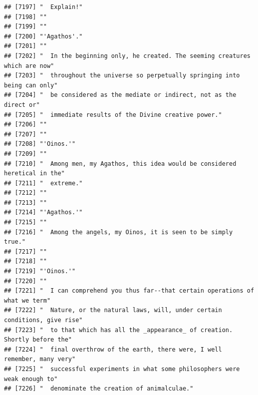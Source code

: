 \documentclass{article}\usepackage[]{graphicx}\usepackage[]{color}
\makeatletter
\newenvironment{kframe}{%
 \def\at@end@of@kframe{}%
 \ifinner\ifhmode%
  \def\at@end@of@kframe{\end{minipage}}%
  \begin{minipage}{\columnwidth}%
 \fi\fi%
 \def\FrameCommand##1{\hskip\@totalleftmargin \hskip-\fboxsep
 \colorbox{shadecolor}{##1}\hskip-\fboxsep
     \hskip-\linewidth \hskip-\@totalleftmargin \hskip\columnwidth}%
 \MakeFramed {\advance\hsize-\width
   \@totalleftmargin\z@ \linewidth\hsize
   \@setminipage}}%
 {\par\unskip\endMakeFramed%
 \at@end@of@kframe}
\newenvironment{knitrout}{}{} %
\makeatother
\begin{document}
\begin{knitrout}
\begin{kframe}
\begin{verbatim}
## [7197] "  Explain!"                                                                  
## [7198] ""                                                                            
## [7199] ""                                                                            
## [7200] "'Agathos'."                                                                  
## [7201] ""                                                                            
## [7202] "  In the beginning only, he created. The seeming creatures which are now"    
## [7203] "  throughout the universe so perpetually springing into being can only"      
## [7204] "  be considered as the mediate or indirect, not as the direct or"            
## [7205] "  immediate results of the Divine creative power."                           
## [7206] ""                                                                            
## [7207] ""                                                                            
## [7208] "'Oinos.'"                                                                    
## [7209] ""                                                                            
## [7210] "  Among men, my Agathos, this idea would be considered heretical in the"     
## [7211] "  extreme."                                                                  
## [7212] ""                                                                            
## [7213] ""                                                                            
## [7214] "'Agathos.'"                                                                  
## [7215] ""                                                                            
## [7216] "  Among the angels, my Oinos, it is seen to be simply true."                 
## [7217] ""                                                                            
## [7218] ""                                                                            
## [7219] "'Oinos.'"                                                                    
## [7220] ""                                                                            
## [7221] "  I can comprehend you thus far--that certain operations of what we term"    
## [7222] "  Nature, or the natural laws, will, under certain conditions, give rise"    
## [7223] "  to that which has all the _appearance_ of creation. Shortly before the"    
## [7224] "  final overthrow of the earth, there were, I well remember, many very"      
## [7225] "  successful experiments in what some philosophers were weak enough to"      
## [7226] "  denominate the creation of animalculae."                                   

\end{verbatim}
\end{kframe}
\end{knitrout}
\end{document}
